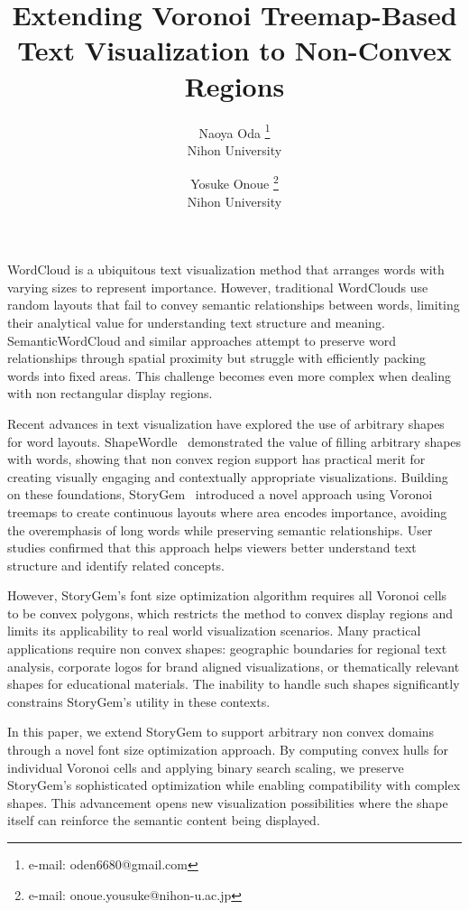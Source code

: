 \documentclass{vgtc}                          %
\title{Extending Voronoi Treemap-Based Text Visualization to Non-Convex Regions}
\author{Naoya Oda \thanks{e-mail: oden6680@gmail.com}\\ \scriptsize Nihon University %
\and Yosuke Onoue \thanks{e-mail: onoue.yousuke@nihon-u.ac.jp}\\ \scriptsize Nihon University}
\begin{document}
\maketitle

WordCloud\cite{viegas2009participatory} is a ubiquitous text visualization method that arranges words with varying sizes to represent importance.
However, traditional WordClouds use random layouts that fail to convey semantic relationships between words, limiting their analytical value for understanding text structure and meaning.
SemanticWordCloud\cite{wu2011semantic} and similar approaches attempt to preserve word relationships through spatial proximity but struggle with efficiently packing words into fixed areas.
This challenge becomes even more complex when dealing with non rectangular display regions.

Recent advances in text visualization have explored the use of arbitrary shapes for word layouts.
ShapeWordle~\cite{8807355} demonstrated the value of filling arbitrary shapes with words, showing that non convex region support has practical merit for creating visually engaging and contextually appropriate visualizations.
Building on these foundations, StoryGem~\cite{oda2025storygemvoronoitreemapapproach} introduced a novel approach using Voronoi treemaps to create continuous layouts where area encodes importance, avoiding the overemphasis of long words while preserving semantic relationships.
User studies confirmed that this approach helps viewers better understand text structure and identify related concepts.

However, StoryGem's font size optimization algorithm requires all Voronoi cells to be convex polygons, which restricts the method to convex display regions and limits its applicability to real world visualization scenarios.
Many practical applications require non convex shapes: geographic boundaries for regional text analysis, corporate logos for brand aligned visualizations, or thematically relevant shapes for educational materials.
The inability to handle such shapes significantly constrains StoryGem's utility in these contexts.

In this paper, we extend StoryGem to support arbitrary non convex domains through a novel font size optimization approach.
By computing convex hulls for individual Voronoi cells and applying binary search scaling, we preserve StoryGem's sophisticated optimization while enabling compatibility with complex shapes.
This advancement opens new visualization possibilities where the shape itself can reinforce the semantic content being displayed.
\end{document}
